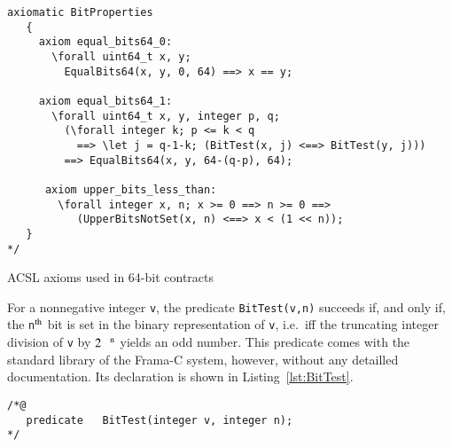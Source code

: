 \begin{listing}[hbt]
\begin{minipage}{0.99\textwidth}
\begin{lstlisting}[style=acsl-block]
   axiomatic BitProperties
   {
     axiom equal_bits64_0:
       \forall uint64_t x, y;
         EqualBits64(x, y, 0, 64) ==> x == y;

     axiom equal_bits64_1:
       \forall uint64_t x, y, integer p, q;
         (\forall integer k; p <= k < q 
           ==> \let j = q-1-k; (BitTest(x, j) <==> BitTest(y, j)))
         ==> EqualBits64(x, y, 64-(q-p), 64);

      axiom upper_bits_less_than:
        \forall integer x, n; x >= 0 ==> n >= 0 ==>
           (UpperBitsNotSet(x, n) <==> x < (1 << n));
   }
*/
\end{lstlisting}
\end{minipage}
\caption{\label{lst:axioms64}ACSL axioms used in 64-bit contracts}
\end{listing}








For a nonnegative integer \lstinline{v},
the predicate \lstinline{BitTest(v,n)} succeeds if, and only if, the
\lstinline{n}$^{\mbox{\scriptsize th}}$ bit is set in the binary
representation of
\lstinline{v}, i.e.\ iff the truncating integer division of \lstinline{v} by
$2^{\mbox{\scriptsize\lstinline{n}}}$ yields an odd number.
%
This predicate comes with the standard library of the Frama-C system,
however, without any detailled documentation.
%
Its declaration is shown in Listing~\ref{lst:BitTest}.


\begin{listing}[hbt]
\begin{minipage}{0.99\textwidth}
\begin{lstlisting}[style=acsl-block]
/*@
   predicate   BitTest(integer v, integer n);
*/
\end{lstlisting}
\end{minipage}
\caption{\label{lst:BitTest}
	The Frama-C library predicate \lstinline{BitTest}}
\end{listing}











%	

